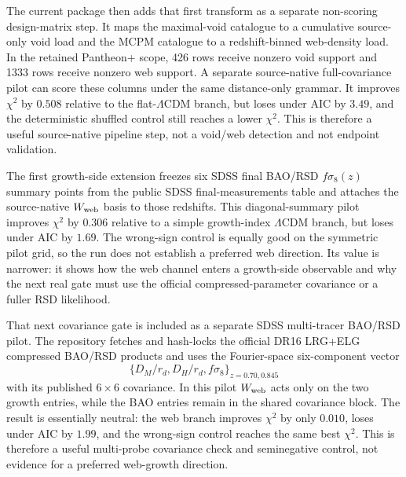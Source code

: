 \documentclass[11pt]{article}
\begin{document}
The current package then adds that first transform as a separate non-scoring
design-matrix step. It maps the maximal-void catalogue to a cumulative
source-only void load and the MCPM catalogue to a redshift-binned web-density
load. In the retained Pantheon+ scope, 426 rows receive nonzero void support and
1333 rows receive nonzero web support. A separate source-native full-covariance
pilot can score these columns under the same distance-only grammar. It improves
\(\chi^2\) by \(0.508\) relative to the flat-\(\Lambda\)CDM branch, but loses
under AIC by \(3.49\), and the deterministic shuffled control still reaches a
lower \(\chi^2\). This is therefore a useful source-native pipeline step, not a
void/web detection and not endpoint validation.

The first growth-side extension freezes six SDSS final BAO/RSD
\(f\sigma_8(z)\) summary points from the public SDSS final-measurements table
and attaches the source-native \(W_{\rm web}\) basis to those redshifts. This
diagonal-summary pilot improves \(\chi^2\) by \(0.306\) relative to a simple
growth-index \(\Lambda\)CDM branch, but loses under AIC by \(1.69\). The
wrong-sign control is equally good on the symmetric pilot grid, so the run does
not establish a preferred web direction. Its value is narrower: it shows how
the web channel enters a growth-side observable and why the next real gate must
use the official compressed-parameter covariance or a fuller RSD likelihood.

That next covariance gate is included as a separate SDSS multi-tracer
BAO/RSD pilot. The repository fetches and hash-locks the official DR16
LRG+ELG compressed BAO/RSD products and uses the Fourier-space six-component
vector
\[
\{D_M/r_d,D_H/r_d,f\sigma_8\}_{z=0.70,0.845}
\]
with its published \(6\times6\) covariance. In this pilot \(W_{\rm web}\)
acts only on the two growth entries, while the BAO entries remain in the
shared covariance block. The result is essentially neutral: the web branch
improves \(\chi^2\) by only \(0.010\), loses under AIC by \(1.99\), and the
wrong-sign control reaches the same best \(\chi^2\). This is therefore a useful
multi-probe covariance check and seminegative control, not evidence for a
preferred web-growth direction.
\end{document}
